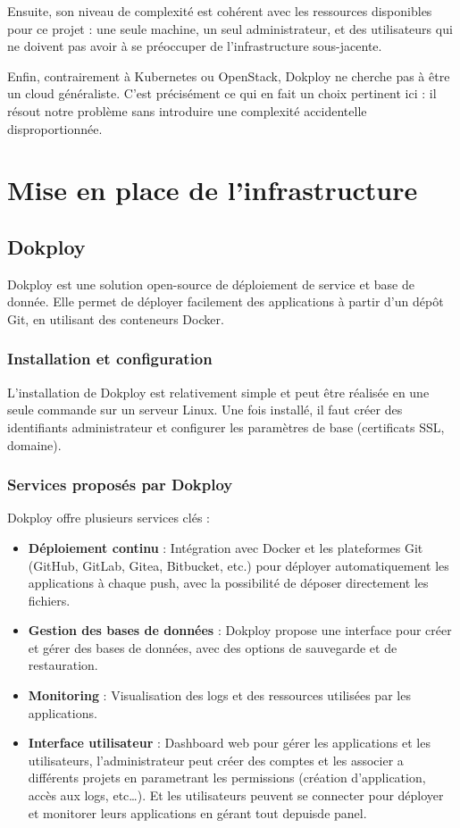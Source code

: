 \documentclass{rapportClass} %
\begin{document}
Ensuite, son niveau de complexité est cohérent avec les ressources disponibles pour ce projet : 
une seule machine, un seul administrateur, et des utilisateurs qui ne doivent pas avoir à se 
préoccuper de l'infrastructure sous-jacente.

Enfin, contrairement à Kubernetes ou OpenStack, Dokploy ne cherche pas à être un cloud généraliste. 
C'est précisément ce qui en fait un choix pertinent ici : il résout notre problème sans introduire 
une complexité accidentelle disproportionnée.


\chapter{Mise en place de l'infrastructure}

\section{Dokploy}
Dokploy est une solution open-source de déploiement de service et base de donnée. %
Elle permet de déployer facilement des applications à partir d’un dépôt Git, en utilisant des conteneurs Docker.

\subsection{Installation et configuration}
L’installation de Dokploy est relativement simple et peut être réalisée en une seule commande sur un serveur Linux.
Une fois installé, il faut créer des identifiants administrateur et configurer les paramètres de base (certificats SSL, domaine).

\subsection{Services proposés par Dokploy}
Dokploy offre plusieurs services clés :
\begin{itemize}
\item \textbf{Déploiement continu} : Intégration avec Docker et les plateformes Git (GitHub, GitLab, Gitea, Bitbucket, etc.)
pour déployer automatiquement les applications à chaque push, avec la possibilité de déposer directement les fichiers.
\item \textbf{Gestion des bases de données} : %
Dokploy propose une interface pour créer et gérer des bases de données, avec des options de sauvegarde et de restauration.
\item \textbf{Monitoring} : Visualisation des logs et des ressources utilisées par les applications.
\item \textbf{Interface utilisateur} : Dashboard web pour gérer les applications et les utilisateurs, 
l'administrateur peut créer des comptes et les associer a différents projets en parametrant 
les permissions (création d'application, accès aux logs, etc\dots).
Et les utilisateurs peuvent se connecter pour déployer et monitorer leurs applications en gérant tout depuisde panel.
\end{itemize}
\end{document}
